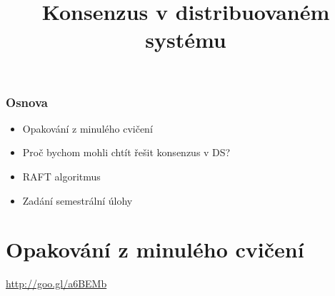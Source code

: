 \documentclass[usenames,dvipsnames,9pt]{beamer}
\title{Konsenzus v distribuovaném systému}
\date{}
\institute{B4B36PDV -- Paralelní a distribuované výpočty}
\begin{document}
\maketitle

\begin{frame}
  \frametitle{Osnova}
  \begin{itemize}
    \item Opakování z minulého cvičení\\[1.5em]
    \item Proč bychom mohli chtít řešit konsenzus v DS?
    \item RAFT algoritmus\\[1.5em]
    \item Zadání semestrální úlohy
  \end{itemize}
\end{frame}


\section{Opakování z minulého cvičení}

\begin{frame}[standout]
 \Huge
 \url{http://goo.gl/a6BEMb}
\end{frame}

\end{document}
